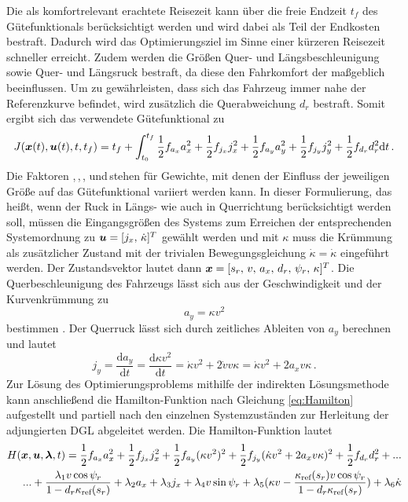 Die als komfortrelevant erachtete Reisezeit kann über die freie Endzeit $t_f$ des Gütefunktionals berücksichtigt werden und wird dabei als Teil der Endkosten \Vofxoftf\,bestraft. Dadurch wird das Optimierungsziel im Sinne einer kürzeren Reisezeit schneller erreicht. Zudem werden die Größen Quer- und Längsbeschleunigung sowie Quer- und Längsruck bestraft, da diese den Fahrkomfort der  maßgeblich beeinflussen. Um zu gewährleisten, dass sich das Fahrzeug immer nahe der Referenzkurve befindet, wird zusätzlich die Querabweichung $d_r$ bestraft. Somit ergibt sich das verwendete Gütefunktional zu
\begin{equation}
	J(\boldsymbol{x}(t),\boldsymbol{u}(t),t,t_f) = t_f + \int_{t_0}^{t_f} \frac{1}{2}f_{a_x} a_x^2 + \frac{1}{2}f_{j_x} j_x^2 + \frac{1}{2}f_{a_y} a_y^2 + \frac{1}{2}f_{j_y} j_y^2 + \frac{1}{2}f_{d_r} d_r^2\textrm{d}{t}\,. \label{eq:J_eingesetzt}
\end{equation}
Die Faktoren \fax,\,\fjx,\,\fay,\,\fjy\,und\fdr\,stehen für Gewichte, mit denen der Einfluss der jeweiligen Größe auf das Gütefunktional variiert werden kann. In dieser Formulierung, das heißt, wenn der Ruck in Längs- wie auch in Querrichtung berücksichtigt werden soll, müssen die Eingangsgrößen des Systems zum Erreichen der entsprechenden Systemordnung zu $\boldsymbol{u} = [j_x,\,\dot{\kappa}]^T$ gewählt werden und mit $\kappa$ muss die Krümmung als zusätzlicher Zustand mit der trivialen Bewegungsgleichung $\dot{\kappa} = \dot{\kappa}$ eingeführt werden. Der Zustandsvektor lautet dann $\boldsymbol{x} = [s_r,\,v,\,a_x,\,d_r,\,\psi_r,\,\kappa]^T$. Die Querbeschleunigung des Fahrzeugs lässt sich aus der Geschwindigkeit und der Kurvenkrümmung zu 
\begin{equation}
	a_y = \kappa v^2 \label{eq:ay}
\end{equation}
bestimmen \cite{Schramm.2013}. Der Querruck lässt sich durch zeitliches Ableiten von $a_y$ berechnen und lautet
\begin{equation}
j_y = \frac{\textrm{d} a_y}{\textrm{d} t} = \frac{\textrm{d} \kappa v^2}{\textrm{d} t} = \dot{\kappa}v^2 + 2\dot{v}v\kappa  = \dot{\kappa}v^2 + 2a_xv\kappa\,. \label{eq:jy}
\end{equation}
Zur Lösung des Optimierungsproblems mithilfe der indirekten Lösungsmethode kann anschließend die Hamilton-Funktion nach Gleichung \eqref{eq:Hamilton} aufgestellt und partiell nach den einzelnen Systemzuständen zur Herleitung der adjungierten \gls{DGL} abgeleitet werden. Die Hamilton-Funktion lautet
\begin{equation}
\begin{split}
H(\boldsymbol{x},\boldsymbol{u},\boldsymbol{\lambda},t) = \frac{1}{2}f_{a_x} a_x^2 + \frac{1}{2}f_{j_x} j_x^2 + \frac{1}{2}f_{a_y} (\kappa v^2)^2 + \frac{1}{2}f_{j_y} (\dot{\kappa}v^2 + 2a_xv\kappa)^2 + \frac{1}{2}f_{d_r} d_r^2 + ... \\
... + \frac{\lambda_1v\cos{\psi_r}}{1-d_r\kappa_{\textrm{ref}}(s_r)} + \lambda_2a_x + \lambda_3j_x + \lambda_4v\sin{\psi_r} + \lambda_5(\kappa v - \frac{\kappa_{\textrm{ref}}(s_r) v\cos{\psi_r}}{1-d_r\kappa_{\textrm{ref}}(s_r)}) + \lambda_6\dot{\kappa} \label{eq:Hamilton_eingesetzt}
\end{split}
\end{equation}
